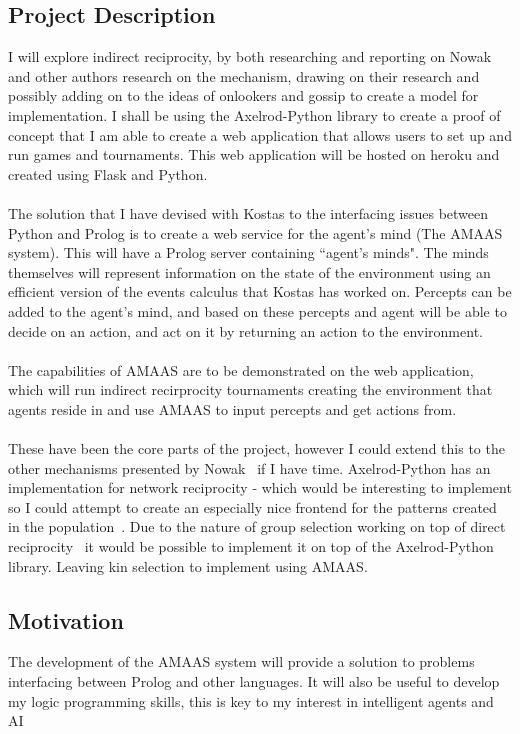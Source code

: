 \documentclass{article}
\begin{document}
\subsection*{Project Description}
I will explore indirect reciprocity, by both researching and reporting on Nowak and other authors research on the mechanism, drawing on their research and possibly adding on to the ideas of onlookers and gossip to create a model for implementation. I shall be using the Axelrod-Python library to create a proof of concept that I am able to create a web application that allows users to set up and run games and tournaments. This web application will be hosted on heroku and created using Flask and Python.\\\\
The solution that I have devised with Kostas to the interfacing issues between Python and Prolog is to create a web service for the agent's mind (The AMAAS system). This will have a Prolog server containing ``agent's minds". The minds themselves will represent information on the state of the environment using an efficient version of the events calculus that Kostas has worked on. Percepts can be added to the agent's mind, and based on these percepts and agent will be able to decide on an action, and act on it by returning an action to the environment.\\\\
The capabilities of AMAAS are to be demonstrated on the web application, which will run indirect recirprocity tournaments creating the environment that agents reside in and use AMAAS to input percepts and get actions from.\\\\
These have been the core parts of the project, however I could extend this to the other mechanisms presented by Nowak~\cite{five_rules_coop} if I have time. Axelrod-Python has an implementation for network reciprocity - which would be interesting to implement so I could attempt to create an especially nice frontend for the patterns created in the population~\cite{spatial}. Due to the nature of group selection working on top of direct reciprocity~\cite{multilevel_nowak} it would be possible to implement it on top of the Axelrod-Python library. Leaving kin selection to implement using AMAAS.

\subsection*{Motivation}
The development of the AMAAS system will provide a solution to problems interfacing between Prolog and other languages. It will also be useful to develop my logic programming skills, this is key to my interest in intelligent agents and AI 
\end{document}
